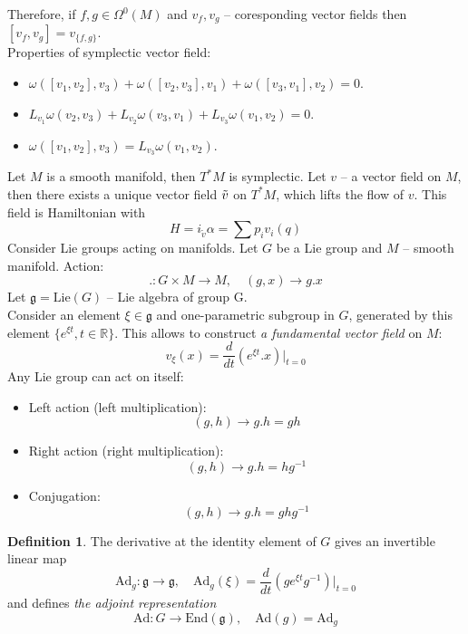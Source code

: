 \documentclass[12pt]{article}
\theoremstyle{definition}
\newtheorem{defin}{Definition}[]
\begin{document}
Therefore, if $f,g\in\Omega^0(M)$ and $v_f,v_g$ -- coresponding vector fields then $[v_f,v_g]=v_{\{f,g\}}$.\\
Properties of symplectic vector field:
\begin{itemize}
    \item $\omega([v_1,v_2],v_3)+\omega([v_2,v_3],v_1)+\omega([v_3,v_1],v_2)=0$.
    \item $L_{v_1}\omega(v_2,v_3)+L_{v_2}\omega(v_3,v_1)+L_{v_3}\omega(v_1,v_2)=0$.
    \item $\omega([v_1,v_2],v_3)=L_{v_3}\omega(v_1,v_2)$.
\end{itemize}
Let $M$ is a smooth manifold, then $T^*M$ is symplectic. Let $v$ -- a vector field on $M$, then there exists a unique vector field $\Tilde{v}$ on $T^*M$, which lifts the flow of $v$. This field is Hamiltonian with
\begin{equation}
    H=i_{\tilde{v}}\alpha=\sum p_iv_i(q)
\end{equation}
Consider Lie groups acting on manifolds. Let $G$ be a Lie group and $M$ -- smooth manifold. Action:
\begin{equation}
    .:G\times M\rightarrow M,\quad(g,x)\rightarrow g.x
\end{equation}
Let $\mathfrak{g}=\text{Lie}(G)$ -- Lie algebra of group G.\\
Consider an element $\xi\in\mathfrak{g}$ and one-parametric subgroup in $G$, generated by this element $\{e^{\xi t},t\in\mathbb{R}\}$. This allows to construct \textit{a fundamental vector field} on $M$:
\begin{equation}
    v_\xi(x)=\frac{d}{dt}(e^{\xi t}.x)|_{t=0}
\end{equation}
Any Lie group can act on itself:
\begin{itemize}
    \item Left action (left multiplication):
    \begin{equation}
        (g,h)\rightarrow g.h=gh
    \end{equation}
    \item Right action (right multiplication):
    \begin{equation}
        (g,h)\rightarrow g.h=hg^{-1}
    \end{equation}
    \item Conjugation:
    \begin{equation}
        (g,h)\rightarrow g.h=ghg^{-1}
    \end{equation}
\end{itemize}
\begin{defin}
    The derivative at the identity element of $G$ gives an invertible linear map
    \begin{equation}
        \text{Ad}_g:\mathfrak{g}\rightarrow\mathfrak{g},\quad\text{Ad}_g(\xi)=\frac{d}{dt}(ge^{\xi t}g^{-1})|_{t=0}
    \end{equation}
    and defines \textit{the adjoint representation}
    \begin{equation}
        \text{Ad}:G\rightarrow\text{End}(\mathfrak{g}),\quad\text{Ad}(g)=\text{Ad}_g
    \end{equation}
\end{defin}
\end{document}
